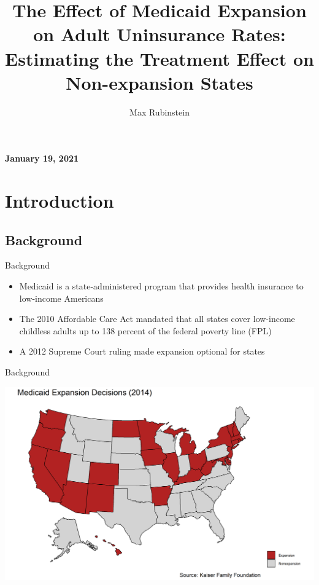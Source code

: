 \documentclass[hyperref={pdfpagelabels=false}]{beamer}
\title{The Effect of Medicaid Expansion on Adult Uninsurance Rates: Estimating the Treatment Effect on Non-expansion States}
\author[shortname]{Max Rubinstein \\}
\institute[]{\and \vspace{-0.26in} \and \vspace{-0.1in}}%
\date{}
\begin{document}

\begin{frame}
\titlepage
\centering 
\vspace{-0.5in}
\textbf{January 19, 2021}
\end{frame} 

\section{Introduction}
\subsection{Background}
\begin{frame}{Background}
\begin{itemize}
    \item Medicaid is a state-administered program that provides health insurance to low-income Americans \bigskip 
    
    \item The 2010 Affordable Care Act mandated that all states cover low-income childless adults up to 138 percent of the federal poverty line (FPL) \bigskip
    
    \item A 2012 Supreme Court ruling made expansion optional for states \bigskip
    
\end{itemize}
\end{frame}

\begin{frame}{Background}
    \begin{center}
	\includegraphics[scale=0.5]{01_Plots/expansion-map.png}
    \end{center}
\end{frame}
\end{document}
